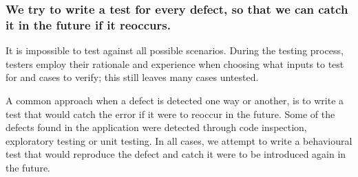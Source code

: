\subsubsection{We try to write a test for every defect, so that we can catch it in the future if it reoccurs.}
It is impossible to test against all possible scenarios. During the testing process, testers employ their rationale and experience when choosing what inputs to test for and cases to verify; this still leaves many cases untested.
\par
A common approach when a defect is detected one way or another, is to write a test that would catch the error if it were to reoccur in the future. Some of the defects found in the application were detected through code inspection, exploratory testing or unit testing. In all cases, we attempt to write a behavioural test that would reproduce the defect and catch it were to be introduced again in the future. 




